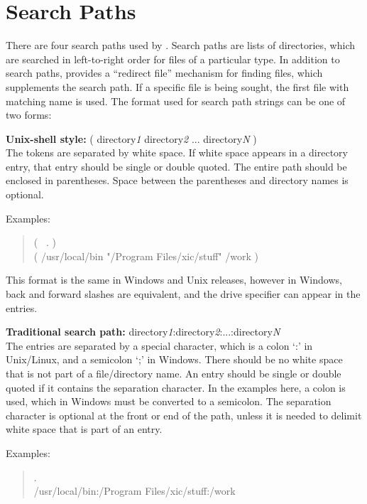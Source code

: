 \section{{\Xic} Search Paths}
\label{searchpaths}

There are four search paths used by {\Xic}.  Search paths are lists of
directories, which are searched in left-to-right order for files of a
particular type.  In addition to search paths, {\Xic} provides a
``redirect file'' mechanism for finding files, which supplements the
search path.  If a specific file is being sought, the first file with
matching name is used.  The format used for search path strings can be
one of two forms:

\begin{description}
\item{{\bf Unix-shell style:}\hspace{5mm}
  {\vt ( directory{\it 1} directory{\it 2} ...  directory{\it N} )}}\\
The tokens are separated by white space.  If white space appears in a
directory entry, that entry should be single or double quoted.  The
entire path should be enclosed in parentheses.  Space between the
parentheses and directory names is optional.

Examples:
\begin{quote}
{\vt ( ~. )}\\
{\vt ( /usr/local/bin "/Program Files/xic/stuff" /work )}
\end{quote}

This format is the same in Windows and Unix releases, however in
Windows, back and forward slashes are equivalent, and the drive
specifier can appear in the entries.

\item{{\bf Traditional search path:}\hspace{5mm}
  {\vt directory{\it 1\/}:directory{\it 2\/}:...:directory{\it N}}}\\
The entries are separated by a special character, which is a colon
`{\vt :}' in Unix/Linux, and a semicolon `{\vt ;}' in Windows.  There
should be no white space that is not part of a file/directory name. 
An entry should be single or double quoted if it contains the
separation character.  In the examples here, a colon is used, which in
Windows must be converted to a semicolon.  The separation character is
optional at the front or end of the path, unless it is needed to
delimit white space that is part of an entry.

Examples:
\begin{quote}
{\vt .}\\
{\vt /usr/local/bin:/Program Files/xic/stuff:/work}
\end{quote}
\end{description}

